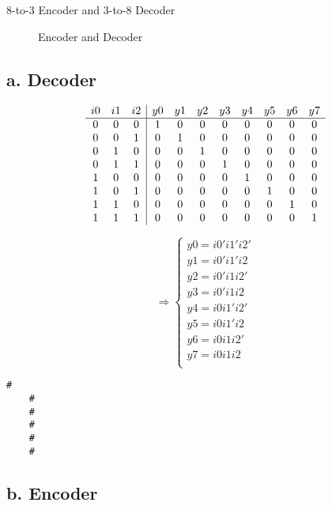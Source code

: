 \documentclass{vhdl-assignment}
\begin{document}
\begin{problem}{8-to-3 Encoder and 3-to-8 Decoder}
\begin{figure}[H]
        \caption{Encoder and Decoder}
    \end{figure}

    \subsection*{a. Decoder}
    \begin{table}[H]
        \begin{displaymath}
            \begin{array}{c c c|c c c c c c c c}
                i0 & i1 & i2 & y0 & y1 & y2 & y3 & y4 & y5 & y6 & y7 \\
                \hline
                0 & 0 & 0 & 1 & 0 & 0 & 0 & 0 & 0 & 0 & 0 \\
                0 & 0 & 1 & 0 & 1 & 0 & 0 & 0 & 0 & 0 & 0 \\
                0 & 1 & 0 & 0 & 0 & 1 & 0 & 0 & 0 & 0 & 0 \\
                0 & 1 & 1 & 0 & 0 & 0 & 1 & 0 & 0 & 0 & 0 \\
                1 & 0 & 0 & 0 & 0 & 0 & 0 & 1 & 0 & 0 & 0 \\
                1 & 0 & 1 & 0 & 0 & 0 & 0 & 0 & 1 & 0 & 0 \\
                1 & 1 & 0 & 0 & 0 & 0 & 0 & 0 & 0 & 1 & 0 \\
                1 & 1 & 1 & 0 & 0 & 0 & 0 & 0 & 0 & 0 & 1 \\
            \end{array}
        \end{displaymath}
        \caption[short]{Decoder 3-to-8 Truth Table}
    \end{table}
    \begin{equation*}
        \Rightarrow
        \begin{cases}
            y0=i0'i1'i2' \\
            y1=i0'i1'i2 \\
            y2=i0'i1i2' \\
            y3=i0'i1i2 \\
            y4=i0i1'i2' \\
            y5=i0i1'i2 \\
            y6=i0i1i2' \\
            y7=i0i1i2 \\
        \end{cases}
    \end{equation*}

    \begin{lstlisting}[caption=Full Adder Testbench Output]
    #
    #
    #
    #
    #
    #   
    \end{lstlisting}
    \subsection*{b. Encoder}


\end{problem}
\end{document}
